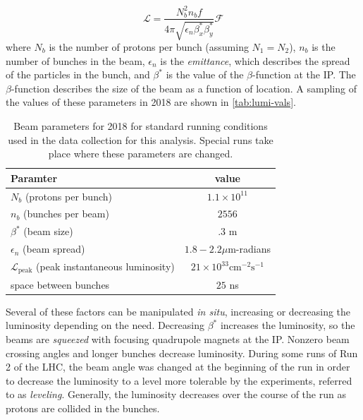 \begin{equation}
\mathcal{L} = \frac{N_b^2 n_b f }{4\pi \sqrt{\epsilon_n \beta^*_x \beta^*_y}}\mathcal{F}
\end{equation}
where $N_b$ is the number of protons per bunch (assuming $N_1 = N_2$), $n_b$ is the number of bunches in the beam, $\epsilon_n$ is the \emph{emittance}, which describes the spread of the particles in the bunch, and $\beta^*$ is the value of the $\beta$-function at the \ac{IP}. The $\beta$-function describes the size of the beam as a function of location. A sampling of the values of these parameters in 2018 are shown in \autoref{tab:lumi-vals}. \cite{pdg}


\begin{table}
\centering
\begin{tabular}{lc}
\hline
Paramter & value  \\
\hline
$N_b$ (protons per bunch)                                           & $1.1 \times 10^{11}$   \\
$n_b$ (bunches per beam)                                            & $2556$   \\
$\beta^*$ (beam size)                                               & $.3$ m   \\
$\epsilon_n$ (beam spread)                                          & $1.8-2.2 \mu$m-radians   \\
$\mathcal{L}_{\textrm{peak}}$ (peak instantaneous luminosity)       & $21 \times 10^{33} \textrm{cm}^{-2}\textrm{s}^{-1}$   \\
space between bunches                                               & $25$ ns   \\
\hline
\end{tabular}
\caption{Beam parameters for 2018 for standard running conditions used in the data collection for this analysis. Special runs take place where these parameters are changed.}
\label{tab:lumi-vals}
\end{table}

Several of these factors can be manipulated \emph{in situ}, increasing or decreasing the luminosity depending on the need. Decreasing $\beta^*$ increases the luminosity, so the beams are \emph{squeezed} with focusing quadrupole magnets at the \ac{IP}. Nonzero beam crossing angles and longer bunches decrease luminosity. During some runs of Run 2 of the \ac{LHC}, the beam angle was changed at the beginning of the run in order to decrease the luminosity to a level more tolerable by the experiments, referred to as \emph{leveling}. Generally, the luminosity decreases over the course of the run as protons are collided in the bunches.


